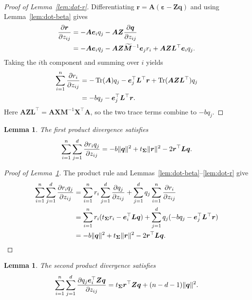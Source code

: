 \documentclass{article}
\theoremstyle{plain}
\newtheorem{lemma}[theorem]{Lemma}
\theoremstyle{definition}
\theoremstyle{definition}
\DeclarePairedDelimiter\norm{\lVert}{\rVert}
\DeclareMathOperator{\trace}{Tr}
\def\mathbold{\boldsymbol}
\def\cal{\mathcal}
\def\bA{\mathbold{A}}\def\calA{{\cal A}}\def\scrA{{\mathscr A}}\def\Ahat{\widehat{A}}\def\Atil{{\widetilde A}}
\def\bL{\mathbold{L}}\def\hbL{{\widehat{\bL}}}\def\tbL{{\widetilde{\bL}}}
\def\bM{\mathbold{M}}\def\hbM{{\widehat{\bM}}}\def\tbM{{\widetilde{\bM}}}
\def\bq{\mathbold{q}}\def\qhat{\widehat{q}}\def\qtil{\widetilde{q}}\def\qbar{{\overline q}}
\def\br{\mathbold{r}}\def\rhat{\widehat{r}}\def\rtil{\widetilde{r}}\def\rbar{{\overline r}}
\def\be{\mathbold{e}}
\def\bX{\mathbold{X}}\def\hbX{{\widehat{\bX}}}\def\tbX{{\tilde{\bX}}}\def\bXbar{{\overline \bX}}
\def\bZ{\mathbold{Z}}\def\hbZ{{\widehat{\bZ}}}\def\tbZ{{\widetilde{\bZ}}}
\def\ep{\varepsilon}\def\eps{\epsilon}\def\veps{\varepsilon}
\def\bep{ {\mathbold{\ep} }}
\def\bSigma{\mathbold{\Sigma}}\def\hbSigma{{\widehat{\bSigma}}}
\begin{document}
\begin{proof}[Proof of Lemma~\ref{lem:dot-r}]
Differentiating $\br=\bA(\bep-\bZ\bq)$ and using
Lemma~\ref{lem:dot-beta} gives
\begin{align*}
    \pdv{\br}{z_{ij}}
    &=-\bA\be_iq_j-\bA\bZ\pdv{\bq}{z_{ij}}\\
    &=-\bA\be_iq_j
       -\bA\bZ\widetilde{\bM}^{-1}\be_jr_i
       +\bA\bZ\bL^\top\be_iq_j.
\end{align*}
Taking the $i$th component and summing over $i$ yields
\begin{align*}
    \sum_{i=1}^n\pdv{r_i}{z_{ij}}
    &=-\trace(\bA)q_j-\be_j^\top\bL^\top\br
       +\trace(\bA\bZ\bL^\top)q_j\\
    &=-bq_j-\be_j^\top\bL^\top\br.
\end{align*}
Here
$\bA\bZ\bL^\top=\bA\bX\bM^{-1}\bX^\top\bA$,
so the two trace terms combine to $-bq_j$.
\end{proof}

\begin{lemma}\label{lem:dot-rh}
The first product divergence satisfies
\begin{align*}
    \sum_{i=1}^n\sum_{j=1}^d\pdv{r_iq_j}{z_{ij}}
    =-b\norm{\bq}^2+t_{\bSigma}\norm{\br}^2
      -2\br^\top\bL\bq.
\end{align*}
\end{lemma}

\begin{proof}[Proof of Lemma~\ref{lem:dot-rh}]
The product rule and Lemmas~\ref{lem:dot-beta}--\ref{lem:dot-r} give
\begin{align*}
    \sum_{i=1}^n\sum_{j=1}^d\pdv{r_iq_j}{z_{ij}}
    &=\sum_{i=1}^n r_i\sum_{j=1}^d\pdv{q_j}{z_{ij}}
       +\sum_{j=1}^d q_j\sum_{i=1}^n\pdv{r_i}{z_{ij}}\\
    &=\sum_{i=1}^n r_i(t_{\bSigma}r_i-\be_i^\top\bL\bq)
       +\sum_{j=1}^d q_j(-bq_j-\be_j^\top\bL^\top\br)\\
    &=-b\norm{\bq}^2+t_{\bSigma}\norm{\br}^2
       -2\br^\top\bL\bq.
\end{align*}
\end{proof}

\begin{lemma}\label{lem:dot-hxh}
The second product divergence satisfies
\begin{align*}
    \sum_{i=1}^n\sum_{j=1}^d
       \pdv{q_j\be_i^\top\bZ\bq}{z_{ij}}
    =t_{\bSigma}\br^\top\bZ\bq+(n-d-1)\norm{\bq}^2.
\end{align*}
\end{lemma}
\end{document}
